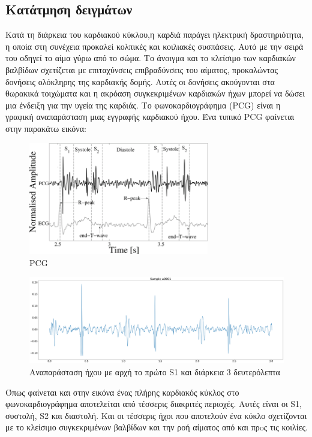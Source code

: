 \documentclass[../main.tex]{subfiles}
\begin{document}
\subsection{Κατάτμηση δειγμάτων}

Κατά τη διάρκεια του καρδιακού κύκλου,η καρδιά παράγει ηλεκτρική δραστηριότητα,
η οποία στη συνέχεια προκαλεί κολπικές και κοιλιακές συσπάσεις. Αυτό με την
σειρά του οδηγεί το αίμα γύρω από το σώμα. Το άνοιγμα και το κλείσιμο των
καρδιακών βαλβίδων σχετίζεται με επιταχύνσεις επιβραδύνσεις του αίματος,
προκαλώντας δονήσεις ολόκληρης της καρδιακής δομής. Αυτές οι δονήσεις ακούγονται
στα θωρακικά τοιχώματα και η ακρόαση συγκεκριμένων καρδιακών ήχων μπορεί να
δώσει μια ένδειξη για την υγεία της καρδιάς. Το φωνοκαρδιογράφημα (PCG) είναι η
γραφική αναπαράσταση μιας εγγραφής καρδιακού ήχου. Ένα τυπικό PCG φαίνεται στην
παρακάτω εικόνα:

\begin{figure}[H]
	\center
	\includegraphics[width=0.7\textwidth]{../images/pcg.png}
	\caption{PCG}
	\label{fig:s1}
\end{figure}


\begin{figure}[H]
	\includegraphics[width=\textwidth]{../images/a0001.png}
	\caption{Αναπαράσταση ήχου με αρχή το πρώτο S1 και διάρκεια 3 δευτερόλεπτα}
	\label{a0001_sound}
\end{figure}

Όπως φαίνεται και στην εικόνα ένας πλήρης καρδιακός κύκλος στο φωνοκαρδιογράφημα
αποτελείται από τέσσερις διακριτές περιοχές. Αυτές είναι οι S1, συστολή, S2 και
διαστολή. Και οι τέσσερις ήχοι που αποτελούν ένα κύκλο σχετίζονται με το
κλείσιμο συγκεκριμένων βαλβίδων και την ροή αίματος από και πρoς τις κοιλίες.
\end{document}
